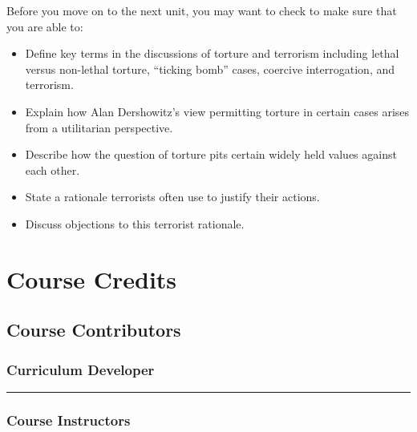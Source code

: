 \documentclass[
]{book}
\providecommand{\tightlist}{%
  \setlength{\itemsep}{0pt}\setlength{\parskip}{0pt}}
\begin{document}
\begin{progress}
Before you move on to the next unit, you may want to check to make sure that you are able to:

\begin{itemize}
\tightlist
\item
  Define key terms in the discussions of torture and terrorism including lethal versus non-lethal torture, ``ticking bomb'' cases, coercive interrogation, and terrorism.
\item
  Explain how Alan Dershowitz's view permitting torture in certain cases arises from a utilitarian perspective.
\item
  Describe how the question of torture pits certain widely held values against each other.
\item
  State a rationale terrorists often use to justify their actions.
\item
  Discuss objections to this terrorist rationale.
\end{itemize}
\end{progress}

\hypertarget{course-credits}{%
\chapter*{Course Credits}\label{course-credits}}

\hypertarget{course-contributors}{%
\section*{Course Contributors}\label{course-contributors}}

\hypertarget{curriculum-developer}{%
\subsection*{Curriculum Developer}\label{curriculum-developer}}

\begin{center}\rule{0.5\linewidth}{0.5pt}\end{center}

\hypertarget{course-instructors}{%
\subsection*{Course Instructors}\label{course-instructors}}
\end{document}

